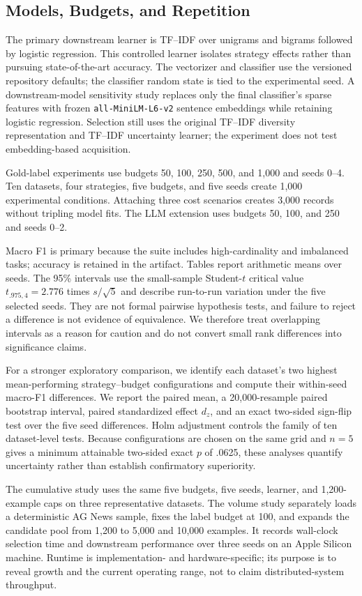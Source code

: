 \documentclass[conference]{IEEEtran}
\begin{document}
\subsection{Models, Budgets, and Repetition}
The primary downstream learner is TF--IDF over unigrams and bigrams followed by logistic regression. This controlled learner isolates strategy effects rather than pursuing state-of-the-art accuracy. The vectorizer and classifier use the versioned repository defaults; the classifier random state is tied to the experimental seed. A downstream-model sensitivity study replaces only the final classifier's sparse features with frozen \texttt{all-MiniLM-L6-v2} sentence embeddings while retaining logistic regression. Selection still uses the original TF--IDF diversity representation and TF--IDF uncertainty learner; the experiment does not test embedding-based acquisition.

Gold-label experiments use budgets 50, 100, 250, 500, and 1,000 and seeds 0--4. Ten datasets, four strategies, five budgets, and five seeds create 1,000 experimental conditions. Attaching three cost scenarios creates 3,000 records without tripling model fits. The LLM extension uses budgets 50, 100, and 250 and seeds 0--2.

Macro F1 is primary because the suite includes high-cardinality and imbalanced tasks; accuracy is retained in the artifact. Tables report arithmetic means over seeds. The 95\% intervals use the small-sample Student-$t$ critical value $t_{.975,4}=2.776$ times $s/\sqrt{5}$ and describe run-to-run variation under the five selected seeds. They are not formal pairwise hypothesis tests, and failure to reject a difference is not evidence of equivalence. We therefore treat overlapping intervals as a reason for caution and do not convert small rank differences into significance claims.

For a stronger exploratory comparison, we identify each dataset's two highest mean-performing strategy--budget configurations and compute their within-seed macro-F1 differences. We report the paired mean, a 20,000-resample paired bootstrap interval, paired standardized effect $d_z$, and an exact two-sided sign-flip test over the five seed differences. Holm adjustment controls the family of ten dataset-level tests. Because configurations are chosen on the same grid and $n=5$ gives a minimum attainable two-sided exact $p$ of .0625, these analyses quantify uncertainty rather than establish confirmatory superiority.

The cumulative study uses the same five budgets, five seeds, learner, and 1,200-example caps on three representative datasets. The volume study separately loads a deterministic AG News sample, fixes the label budget at 100, and expands the candidate pool from 1,200 to 5,000 and 10,000 examples. It records wall-clock selection time and downstream performance over three seeds on an Apple Silicon machine. Runtime is implementation- and hardware-specific; its purpose is to reveal growth and the current operating range, not to claim distributed-system throughput.
\end{document}
